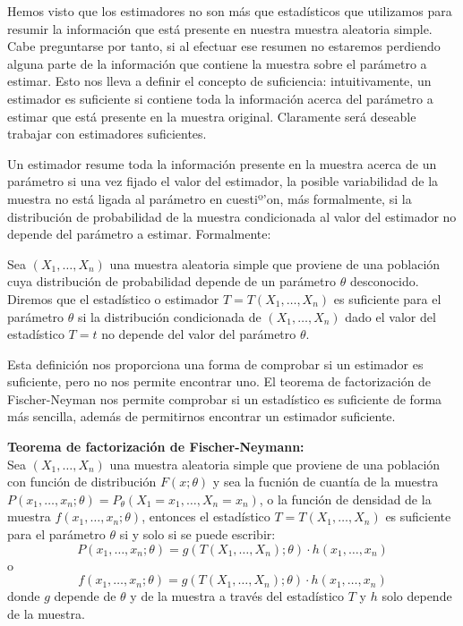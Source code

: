
Hemos visto que los estimadores no son m\'as que estad\'isticos que utilizamos para resumir la informaci\'on que est\'a presente en nuestra muestra aleatoria simple. Cabe preguntarse por tanto, si al efectuar ese resumen no estaremos perdiendo alguna parte de la informaci\'on que contiene la muestra sobre el par\'ametro a estimar. Esto nos lleva a definir el concepto de suficiencia: intuitivamente, un estimador es suficiente si contiene toda la informaci\'on acerca del par\'ametro a estimar que est\'a presente en la muestra original. Claramente ser\'a deseable trabajar con estimadores suficientes.

Un estimador resume toda la informaci\'on presente en la muestra acerca de un par\'ametro si una vez fijado el valor del estimador, la posible variabilidad de la muestra no est\'a ligada al par\'ametro en cuestiº'on, m\'as formalmente, si la distribuci\'on de probabilidad de la muestra condicionada al valor del estimador no depende del par\'ametro a estimar. Formalmente:
\begin{definicion}
Sea $(X_1,\ldots,X_n)$ una muestra aleatoria simple que proviene de una poblaci\'on cuya distribuci\'on de probabilidad depende de un par\'ametro $\theta$ desconocido. Diremos que el estad\'istico o estimador $T=T(X_1,\ldots,X_n)$ es suficiente para el par\'ametro $\theta$ si la distribuci\'on condicionada de $(X_1,\ldots,X_n)$ dado el valor del estad\'istico $T=t$ no depende del valor del par\'ametro $\theta$.
\end{definicion}

Esta definici\'on nos proporciona una forma de comprobar si un estimador es suficiente, pero no nos permite encontrar uno. El teorema de factorizaci\'on de Fischer-Neyman nos permite comprobar si un estad\'istico es suficiente de forma m\'as sencilla, adem\'as de permitirnos encontrar un estimador suficiente.

\begin{teorema}
\textbf{Teorema de factorizaci\'on de Fischer-Neymann:}\\
Sea $(X_1,\ldots,X_n)$ una muestra aleatoria simple que proviene de una poblaci\'on con funci\'on de distribuci\'on $F(x;\theta)$ y sea la fucni\'on de cuant\'ia de la muestra $P(x_1,\ldots,x_n;\theta)=P_{\theta}(X_1=x_1,\ldots,X_n=x_n)$, o la funci\'on de densidad de la muestra $f(x_1,\ldots,x_n;\theta)$, entonces el estad\'istico $T=T(X_1,\ldots,X_n)$ es suficiente para el par\'ametro $\theta$ si y solo si se puede escribir:
\begin{equation*}
P(x_1,\ldots,x_n;\theta)=g(T(X_1,\ldots,X_n);\theta)\cdot h(x_1,\ldots,x_n)
\end{equation*}
o
\begin{equation*}
f(x_1,\ldots,x_n;\theta)=g(T(X_1,\ldots,X_n);\theta)\cdot h(x_1,\ldots,x_n)
\end{equation*}
donde $g$ depende de $\theta$ y de la muestra a trav\'es del estad\'istico $T$ y $h$ solo depende de la muestra.
\end{teorema}


